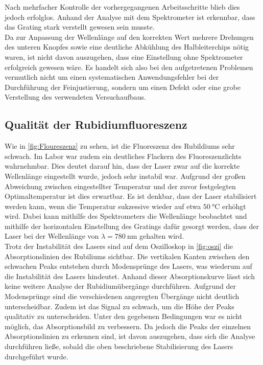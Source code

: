         Nach mehrfacher Kontrolle der vorhergegangenen Arbeitsschritte blieb dies jedoch erfolglos.
        Anhand der Analyse mit dem Spektrometer ist erkennbar, dass das Grating stark verstellt gewesen sein musste. 
        \\
        Da zur Anpassung der Wellenlänge auf den korrekten Wert mehrere Drehungen des unteren Knopfes sowie eine deutliche Abkühlung des Halbleiterchips nötig waren, ist nicht davon auszugehen, dass eine Einstellung ohne Spektrometer erfolgreich gewesen wäre.
        Es handelt sich also bei den aufgetretenen Problemen vermutlich nicht um einen systematischen Anwendungsfehler bei der Durchführung der Feinjustierung, sondern um einen Defekt oder eine grobe Verstellung des verwendeten Versuchaufbaus.
    \subsection{Qualität der Rubidiumfluoreszenz}
        Wie in \autoref{fig:Floureszenz} zu sehen, ist die Fluoreszenz des Rubildiums sehr schwach. Im Labor war zudem ein deutliches Flackern des Fluoreszenzlichts wahrnehmbar.
        Dies deutet darauf hin, dass der Laser zwar auf die korrekte Wellenlänge eingestellt wurde, jedoch sehr instabil war.
        Aufgrund der großen Abweichung zwischen eingestellter Temperatur und der zuvor festgelegten Optimaltemperatur ist dies erwartbar.
        Es ist denkbar, dass der Laser stabilisiert werden kann, wenn die Temperatur sukzessive wieder auf etwa $\qty{50}{\degreeCelsius}$ erhöhgt wird.
        Dabei kann mithilfe des Spektrometers die Wellenlänge beobachtet und mithilfe der horizontalen Einstellung des Gratings dafür gesorgt werden, dass der Laser bei der Wellenlänge von $\lambda = \qty{780}{\nano\meter}$ gehalten wird.
        \\
        Trotz der Instabilität des Lasers sind auf dem Oszilloskop in \autoref{fig:oszi} die Absorptionslinien des Rubiliums sichtbar.
        Die vertikalen Kanten zwischen den schwachen Peaks entstehen durch Modensprünge des Lasers, was wiederum auf die Instabilität des Lasers hindeutet. 
        Anhand dieser Absorptionskurve lässt sich keine weitere Analyse der Rubidiumübergänge durchführen. Aufgrund der Modensprünge sind die verschiedenen angeregten Übergänge nicht deutlich unterscheidbar.
        Zudem ist das Signal zu schwach, um die Höhe der Peaks qualitativ zu unterscheiden. Unter den gegebenen Bedingungen war es nicht möglich, das Absorptionsbild zu verbessern.
        Da jedoch die Peaks der einzelnen Absorptionslinien zu erkennen sind, ist davon auszugehen, dass sich die Analyse durchführen ließe, sobald die oben beschriebene Stabilisierung des Lasers durchgeführt wurde.